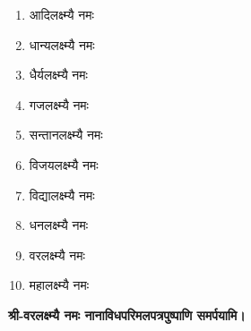 
\begin{multicols}{2}
\begin{enumerate}
\item आदिलक्ष्म्यै नमः
\item धान्यलक्ष्म्यै नमः
\item धैर्यलक्ष्म्यै नमः
\item गजलक्ष्म्यै नमः
\item सन्तानलक्ष्म्यै नमः
\item विजयलक्ष्म्यै नमः
\item विद्यालक्ष्म्यै नमः
\item धनलक्ष्म्यै नमः
\item वरलक्ष्म्यै नमः
\item महालक्ष्म्यै नमः 
\end{enumerate}
\end{multicols}



\begingroup
\centering
\setlength{\columnseprule}{1pt}
\let\chapt\sect


\endgroup

\textbf{श्री-वरलक्ष्म्यै नमः नानाविध\-परिमल\-पत्रपुष्पाणि समर्पयामि।}

